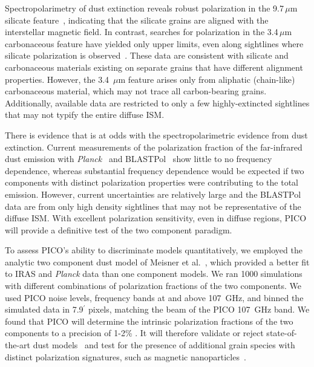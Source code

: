 \documentclass[PICOReport.tex]{subfiles}
\begin{document}
Spectropolarimetry of dust extinction reveals robust polarization in the 9.7\,$\mu$m silicate feature~\citep[e.g.,][]{Smith2000}, indicating that the silicate grains are aligned with the interstellar magnetic field. In contrast, searches for polarization in the 3.4\,$\mu$m carbonaceous feature have yielded only upper limits, even along sightlines where silicate polarization is observed~\citep{Chiar2006,Mason2007}. These data are consistent with silicate and carbonaceous materials existing on separate grains that have different alignment properties. However, the 3.4~$\mu$m feature arises only from aliphatic (chain-like) carbonaceous material, which may not trace all carbon-bearing grains. Additionally, available data are restricted to only a few highly-extincted sightlines that may not typify the entire diffuse \ac{ISM}.

There is evidence that is at odds with the spectropolarimetric evidence from dust extinction. Current measurements of the polarization fraction of the far-infrared dust emission with {\it Planck}~\citep{Planck_Int_XXII} and BLASTPol~\citep{Ashton2018} show little to no frequency dependence, whereas substantial frequency dependence would be expected if two components with distinct polarization properties were contributing to the total emission. However, current uncertainties are relatively large and the BLASTPol data are from only high density sightlines that may not be representative of the diffuse \ac{ISM}. With excellent polarization sensitivity, even in diffuse regions, PICO will provide a definitive test of the two component paradigm.

To assess PICO's ability to discriminate models quantitatively, we employed the analytic two component dust model of Meisner et al.~\cite{Meisner2015}, which provided a better fit to IRAS and {\it Planck} data than one component models. We ran 1000 simulations with different combinations of polarization fractions of the two components. We used PICO  noise levels, frequency bands at and above 107~GHz, and binned the simulated data in 7.9$^\prime$ pixels, matching the beam of the PICO 107~GHz band. We found that PICO will determine the intrinsic polarization fractions of the two components to a precision of 1-2\% . It will therefore validate or reject state-of-the-art dust models~\citep[e.g.][Hensley \& Draine, in prep]{Guillet2018} and test for the presence of additional grain species with distinct polarization signatures, such as magnetic nanoparticles~\citep{Draine2013}. %
%
\end{document}
